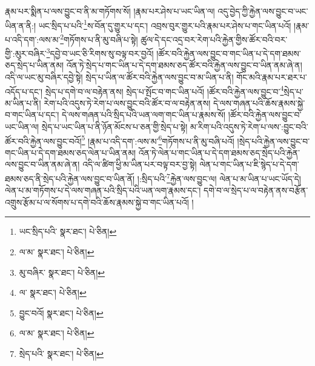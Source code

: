 རྣམ་པར་སྨིན་པ་ལས་བྱུང་བ་ནི་མ་གཏོགས་སོ། །རྣམ་པར་ཤེས་པ་ཡང་ཡིན་ལ། འདུ་བྱེད་ཀྱི་རྐྱེན་ལས་བྱུང་བ་ཡང་ཡིན་ན་ནི:། ཡང་སྲིད་པ་པའི་\footnote{ཡང་སྲིད་པའི་  སྣར་ཐང་།  པེ་ཅིན། }ས་བོན་དུ་གྱུར་པ་དང་། འབྲས་བུར་གྱུར་པའི་རྣམ་པར་ཤེས་པ་གང་ཡིན་པའོ། །རྣམ་པ་འདི་དག་:ལས་མ་\footnote{ལ་མ་  སྣར་ཐང་།  པེ་ཅིན། }གཏོགས་པ་ནི་མུ་བཞི་པ་སྟེ། ཚུལ་དེ་དང་འདྲ་བར་རེག་པའི་རྐྱེན་གྱིས་ཚོར་བའི་བར་གྱི་:མུར་བཞིར་\footnote{མུ་བཞིར་  སྣར་ཐང་།  པེ་ཅིན། }དབྱེ་བ་ཡང་ཅི་རིགས་སུ་བལྟ་བར་བྱའོ། །ཚོར་བའི་རྐྱེན་ལས་བྱུང་བ་གང་ཡིན་པ་དེ་དག་ཐམས་ཅད་སྲེད་པ་ཡིན་ནམ། འོན་ཏེ་སྲེད་པ་གང་ཡིན་པ་དེ་དག་ཐམས་ཅད་ཚོར་བའི་རྐྱེན་ལས་བྱུང་བ་ཡིན་ནམ་ཞེ་ན། འདི་ལ་ཡང་མུ་བཞིར་དབྱེ་སྟེ། སྲེད་པ་ཡིན་ལ་ཚོར་བའི་རྐྱེན་ལས་བྱུང་བ་མ་ཡིན་པ་ནི། གོང་མའི་རྣམ་པར་ཐར་པ་འདོད་པ་དང་། སྲེད་པ་དགེ་བ་ལ་བརྟེན་ནས། སྲེད་པ་སྤོང་བ་གང་ཡིན་པའོ། །ཚོར་བའི་རྐྱེན་ལས་བྱུང་བ་\footnote{ལ་  སྣར་ཐང་།  པེ་ཅིན། }སྲེད་པ་མ་ཡིན་པ་ནི། རེག་པའི་འདུས་ཏེ་རེག་པ་ལས་བྱུང་བའི་ཚོར་བ་ལ་བརྟེན་ནས། དེ་ལས་གཞན་པའི་ཆོས་རྣམས་སྐྱེ་བ་གང་ཡིན་པ་དང་། དེ་ལས་གཞན་པའི་སྲིད་པའི་ཡན་ལག་གང་ཡིན་པ་རྣམས་སོ། །ཚོར་བའི་རྐྱེན་ལས་བྱུང་བ་ཡང་ཡིན་ལ། སྲེད་པ་ཡང་ཡིན་པ་ནི་ཉོན་མོངས་པ་ཅན་གྱི་སྲེད་པ་སྟེ། མ་རིག་པའི་འདུས་ཏེ་རེག་པ་ལས་:བྱུང་བའི་ཚོར་བའི་རྐྱེན་ལས་བྱུང་བའོ།\footnote{བྱུང་བའོ།  སྣར་ཐང་།  པེ་ཅིན། } །རྣམ་པ་འདི་དག་:ལས་མ་\footnote{ལ་མ་  སྣར་ཐང་།  པེ་ཅིན། }གཏོགས་པ་ནི་མུ་བཞི་པའོ། །སྲེད་པའི་རྐྱེན་ལས་བྱུང་བ་གང་ཡིན་པ་དེ་དག་ཐམས་ཅད་ལེན་པ་ཡིན་ནམ། འོན་ཏེ་ལེན་པ་གང་ཡིན་པ་དེ་དག་ཐམས་ཅད་སྲེད་པའི་རྐྱེན་ལས་བྱུང་བ་ཡིན་ནམ་ཞེ་ན། འདི་ལ་ཚིག་ཕྱི་མ་ཡིན་པར་བལྟ་བར་བྱ་སྟེ། ལེན་པ་གང་ཡིན་པ་ཇི་སྙེད་པ་དེ་དག་ཐམས་ཅད་ནི་སྲེད་པའི་རྐྱེན་ལས་བྱུང་བ་ཡིན་ནོ། །:སྲིད་པའི་\footnote{སྲེད་པའི་  སྣར་ཐང་།  པེ་ཅིན། }རྐྱེན་ལས་བྱུང་ལ། ལེན་པ་མ་ཡིན་པ་ཡང་ཡོད་དེ། ལེན་པ་མ་གཏོགས་པ་དེ་ལས་གཞན་པའི་སྲིད་པའི་ཡན་ལག་རྣམས་དང་། དགེ་བ་ལ་སྲེད་པ་ལ་བརྟེན་ནས་བརྩོན་འགྲུས་རྩོམ་པ་ལ་སོགས་པ་དགེ་བའི་ཆོས་རྣམས་སྐྱེ་བ་གང་ཡིན་པའོ། །
